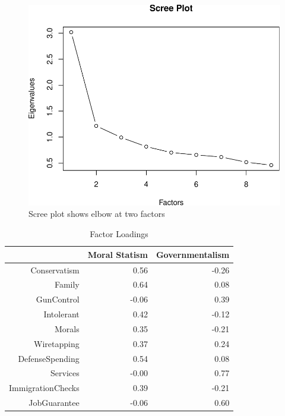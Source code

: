 \documentclass[12pt,]{article}
\begin{document}
\begin{figure}[htbp]
\centering
\includegraphics{figures/scree-1.pdf}
\caption{Scree plot shows elbow at two factors}
\end{figure}

\clearpage

\begin{table}[ht]
\centering
\begin{tabular}{rrr}
  \hline
 & Moral Statism & Governmentalism \\ 
  \hline
Conservatism & 0.56 & -0.26 \\ 
  Family & 0.64 & 0.08 \\ 
  GunControl & -0.06 & 0.39 \\ 
  Intolerant & 0.42 & -0.12 \\ 
  Morals & 0.35 & -0.21 \\ 
  Wiretapping & 0.37 & 0.24 \\ 
  DefenseSpending & 0.54 & 0.08 \\ 
  Services & -0.00 & 0.77 \\ 
  ImmigrationChecks & 0.39 & -0.21 \\ 
  JobGuarantee & -0.06 & 0.60 \\ 
   \hline
\end{tabular}
\caption{Factor Loadings} 
\label{Factor Loadings}
\end{table}

\clearpage
\end{document}
